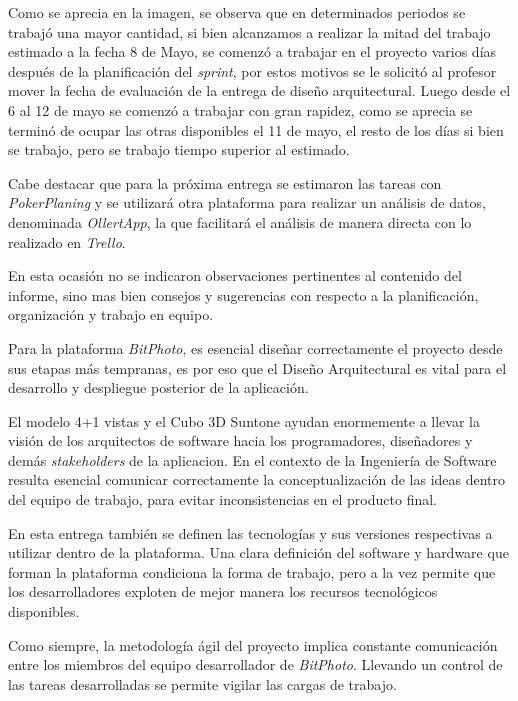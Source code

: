 \documentclass{memoria}
\begin{document}
Como se aprecia en la imagen, se observa que en determinados periodos se trabajó una mayor cantidad, si bien alcanzamos a realizar la mitad del trabajo estimado a la fecha 8 de Mayo, se comenzó a trabajar en el proyecto varios días después de la planificación del \textsl{sprint}, por estos motivos se le solicitó al profesor mover la fecha de evaluación de la entrega de diseño arquitectural. Luego desde el 6 al 12 de mayo se comenzó a trabajar con gran rapidez, como se aprecia se terminó de ocupar las otras disponibles el 11 de mayo, el resto de los días si bien se trabajo, pero se trabajo tiempo superior al estimado.

Cabe destacar que para la próxima entrega se estimaron las tareas con \textsl{PokerPlaning} y se utilizará otra plataforma para realizar un análisis de datos, denominada \textsl{OllertApp}, la que facilitará el análisis de manera directa con lo realizado en \textsl{Trello}.


En esta ocasión no se indicaron observaciones pertinentes al contenido del informe, sino mas bien consejos y sugerencias con respecto a la planificación, organización y trabajo en equipo.


Para la plataforma \textsl{BitPhoto}, es esencial diseñar correctamente el proyecto desde sus etapas más tempranas, es por eso que el Diseño Arquitectural es vital para el desarrollo y despliegue posterior de la aplicación.

El modelo 4+1 vistas y el Cubo 3D Suntone ayudan enormemente a llevar la visión de los arquitectos de software hacia los programadores, diseñadores y demás \textsl{stakeholders} de la aplicacion. En el contexto de la Ingeniería de Software resulta esencial comunicar correctamente la conceptualización de las ideas dentro del equipo de trabajo, para evitar inconsistencias en el producto final.

En esta entrega también se definen las tecnologías y sus versiones respectivas a utilizar dentro de la plataforma. Una clara definición del software y hardware que forman la plataforma condiciona la forma de trabajo, pero a la vez permite que los desarrolladores exploten de mejor manera los recursos tecnológicos disponibles.

Como siempre, la metodología ágil del proyecto implica constante comunicación entre los miembros del equipo desarrollador de \textsl{BitPhoto}. Llevando un control de las tareas desarrolladas se permite vigilar las cargas de trabajo.
\end{document}
